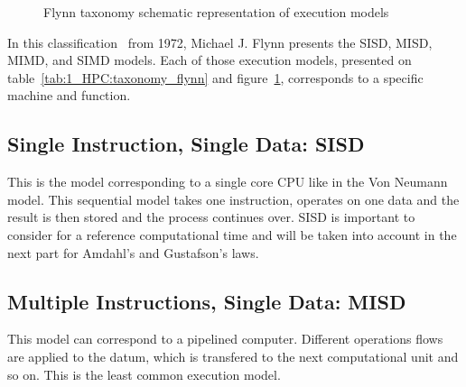 \begin{table}
\centering
{}
\caption{Flynn taxonomy for execution models completed with SPMD and SIMT models}
\label{tab:1_HPC:taxonomy_flynn}
\end{table}

\begin{figure}

\caption{Flynn taxonomy schematic representation of execution models}
\label{fig:1_HPC:flynn_taxonomy}
\end{figure}

In this classification~\cite{flynn1972some} from 1972, Michael J. Flynn presents the SISD, MISD, MIMD, and SIMD models.
Each of those execution models, presented on table~\ref{tab:1_HPC:taxonomy_flynn} and figure~\ref{fig:1_HPC:flynn_taxonomy}, corresponds to a specific machine and function.

\subsection{Single Instruction, Single Data: SISD}
This is the model corresponding to a single core CPU like in the Von Neumann model. 
This sequential model takes one instruction, operates on one data and the result is then stored and the process continues over. 
SISD is important to consider for a reference computational time and will be taken into account in the next part for Amdahl's and Gustafson's laws.

\subsection{Multiple Instructions, Single Data: MISD}
This model can correspond to a pipelined computer.
Different operations flows are applied to the datum, which is transfered to the next computational unit and so on. 
This is the least common execution model.


